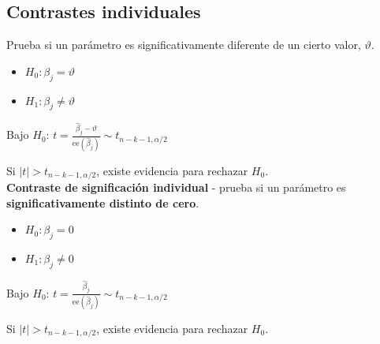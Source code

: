 \documentclass[10pt, a4paper, landscape]{extarticle}
\newcommand{\ee}{\mathrm{ee}}
\begin{document}
\begin{multicols}{3}
	\subsection*{Contrastes individuales}
		Prueba si un parámetro es significativamente diferente de un cierto valor, $\vartheta$.
		\begin{itemize}[leftmargin=*]
			\item $H_0: \beta_j = \vartheta$
			\item $H_1: \beta_j \neq \vartheta$
		\end{itemize}
		\begin{center}
			Bajo $H_0$: \quad
			$t = \frac{\hat{\beta}_j - \vartheta}{\ee(\hat{\beta}_j)} \sim t_{n-k-1, \alpha/2}$
		\end{center}
		Si $\mid t \mid > t_{n-k-1, \alpha/2}$, existe evidencia para rechazar $H_0$. \\
		\textbf{Contraste de significación individual} - prueba si un parámetro es \textbf{significativamente distinto de cero}.
		\begin{itemize}[leftmargin=*]
			\item $H_0: \beta_j = 0$
			\item $H_1: \beta_j \neq 0$
		\end{itemize}
		\begin{center}
			Bajo $H_0$: \quad
			$t = \frac{\hat{\beta}_j}{\ee(\hat{\beta}_j)} \sim t_{n-k-1, \alpha/2}$
		\end{center}
		Si $\mid t \mid > t_{n-k-1, \alpha/2}$, existe evidencia para rechazar $H_0$.

\end{multicols}
\end{document}
